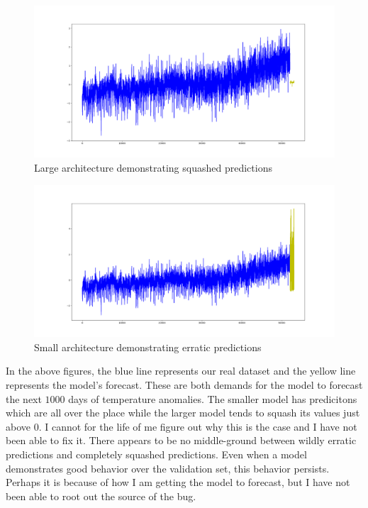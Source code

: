 \documentclass[letterpaper,12pt]{article}
\theoremstyle{plain}
\theoremstyle{definition}
\newcounter{r}
\begin{document}
\begin{figure}[ht]
  \begin{center}
    \includegraphics[scale=0.27]{squash_predictions.png}
    \caption{Large architecture demonstrating squashed predictions}
    \label{squash}
  \end{center}
\end{figure}

\begin{figure}[ht]
  \begin{center}
    \includegraphics[scale=0.27]{erratic_predictions.png}
    \caption{Small architecture demonstrating erratic predictions}
  \end{center}
  \label{erratic}
\end{figure}

In the above figures, the blue line represents our real dataset and the yellow
line represents the model's forecast. These are both demands for the model to
forecast the next $1000$ days of temperature anomalies. The smaller model has
predicitons which are all over the place while the larger model tends to squash
its values just above $0$. I cannot for the life of me figure out why this is
the case and I have not been able to fix it. There appears to be no
middle-ground between wildly erratic predictions and completely squashed
predictions. Even when a model demonstrates good behavior over the validation
set, this behavior persists. Perhaps it is because of how I am getting the
model to forecast, but I have not been able to root out the source of the bug.
\end{document}
